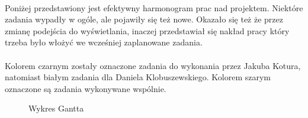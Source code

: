 \paragraph{}

Poniżej przedstawiony jest efektywny harmonogram prac nad projektem. Niektóre zadania wypadły w ogóle, ale pojawiły się też nowe. Okazało się też że przez zmianę podejścia do wyświetlania, inaczej przedstawiał się nakład pracy który trzeba było włożyć we wcześniej zaplanowane zadania.

\paragraph{}

Kolorem czarnym zostały oznaczone zadania do wykonania przez Jakuba Kotura, natomiast białym zadania dla Daniela Klobuszewskiego. Kolorem szarym oznaczone są zadania wykonywane wspólnie.

\begin{landscape}
\begin{figure}[ht]
	\begin{gantt}{21}{14}
		\begin{ganttitle}
		\end{ganttitle}
		\begin{ganttitle}
			\numtitle{40}{1}{52}{1}
			\numtitle{1}{1}{1}{1}
		\end{ganttitle}
	\end{gantt}
	\caption{Wykres Gantta}
	\label{gantt}
\end{figure}
\end{landscape}
